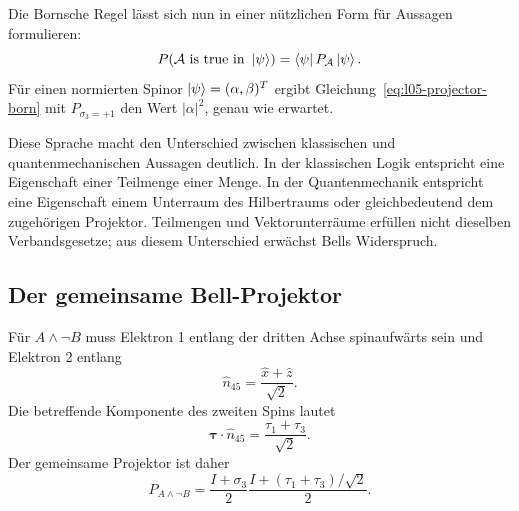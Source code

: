 \begin{classroomqa}
\end{classroomqa}

Die Bornsche Regel lässt sich nun in einer nützlichen Form für Aussagen formulieren:
\begin{equation}
  P(\mathcal A\text{ is true in }\left\lvert\psi\right\rangle)
  =
  \left\langle\psi\right\rvert P_{\mathcal A}\left\lvert\psi\right\rangle.
  \label{eq:l05-projector-born}
\end{equation}
Für einen normierten Spinor \(\left\lvert\psi\right\rangle=(\alpha,\beta)^T\) ergibt Gleichung~\eqref{eq:l05-projector-born} mit \(P_{\sigma_3=+1}\) den Wert \(|\alpha|^2\), genau wie erwartet.

Diese Sprache macht den Unterschied zwischen klassischen und quantenmechanischen Aussagen deutlich. In der klassischen Logik entspricht eine Eigenschaft einer Teilmenge einer Menge. In der Quantenmechanik entspricht eine Eigenschaft einem Unterraum des Hilbertraums oder gleichbedeutend dem zugehörigen Projektor. Teilmengen und Vektorunterräume erfüllen nicht dieselben Verbandsgesetze; aus diesem Unterschied erwächst Bells Widerspruch.

\subsection{Der gemeinsame Bell-Projektor}

Für \(A\wedge\neg B\) muss Elektron 1 entlang der dritten Achse spinaufwärts sein und Elektron 2 entlang
\begin{equation}
  \hat n_{45}=\frac{\hat x+\hat z}{\sqrt2}.
\end{equation}
Die betreffende Komponente des zweiten Spins lautet
\begin{equation}
  \boldsymbol{\tau}\cdot\hat n_{45}
  =
  \frac{\tau_1+\tau_3}{\sqrt2}.
\end{equation}
Der gemeinsame Projektor ist daher
\begin{equation}
  P_{A\wedge\neg B}
  =
  \frac{I+\sigma_3}{2}
  \frac{I+(\tau_1+\tau_3)/\sqrt2}{2}.
  \label{eq:l05-joint-projector}
\end{equation}

\begin{classroomqa}
\end{classroomqa}

